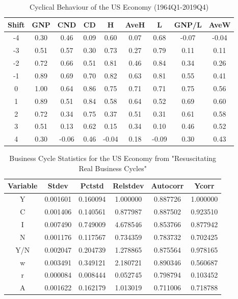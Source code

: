 \documentclass[a4paper,10pt]{report}
\begin{document}
\begin{table}[h]
\centering
\caption{Cyclical Behaviour of the US Economy (1964Q1-2019Q4)}
\label{tab:tab1}
\begin{tabular}{ccccccccc}
\hline
Shift & GNP & CND & CD & H & AveH & L & GNP/L & AveW \\ \hline
-4 & 0.30 & 0.46 & 0.09 & 0.60 & 0.07 & 0.68 & -0.07 & -0.04 \\
-3 & 0.51 & 0.57 & 0.30 & 0.73 & 0.27 & 0.79 & 0.11 & 0.11 \\
-2 & 0.72 & 0.66 & 0.51 & 0.81 & 0.46 & 0.84 & 0.34 & 0.26 \\
-1 & 0.89 & 0.69 & 0.70 & 0.82 & 0.63 & 0.81 & 0.55 & 0.41 \\
0 & 1.00 & 0.64 & 0.86 & 0.75 & 0.71 & 0.71 & 0.75 & 0.56 \\
1 & 0.89 & 0.51 & 0.84 & 0.58 & 0.64 & 0.52 & 0.69 & 0.60 \\
2 & 0.72 & 0.34 & 0.75 & 0.37 & 0.51 & 0.31 & 0.61 & 0.58 \\
3 & 0.51 & 0.13 & 0.62 & 0.15 & 0.34 & 0.10 & 0.46 & 0.52 \\
4 & 0.30 & -0.06 & 0.46 & -0.04 & 0.18 & -0.09 & 0.30 & 0.43 \\ \hline
\end{tabular}
\end{table}

\begin{table}[t]
\centering
\caption{Business Cycle Statistics for the US Economy from "Resuscitating Real Business
Cycles"}
\label{tab:tab2}
\begin{tabular}{cccccc}
\hline
Variable & Stdev & Pctstd & Relstdev & Autocorr & Ycorr \\ \hline
Y & 0.001601 & 0.160094 & 1.000000 & 0.887726 & 1.000000 \\
C & 0.001406 & 0.140561 & 0.877987 & 0.887502 & 0.923510 \\
I & 0.007490 & 0.749009 & 4.678546 & 0.853766 & 0.877942 \\
N & 0.001176 & 0.117567 & 0.734359 & 0.783732 & 0.702425 \\
Y/N & 0.002047 & 0.204739 & 1.278865 & 0.875564 & 0.978165 \\
w & 0.003491 & 0.349121 & 2.180721 & 0.890346 & 0.560687 \\
r & 0.000084 & 0.008444 & 0.052745 & 0.798794 & 0.103452 \\
A & 0.001622 & 0.162179 & 1.013019 & 0.711006 & 0.718788 \\ \hline
\end{tabular}
\end{table}
\end{document}
